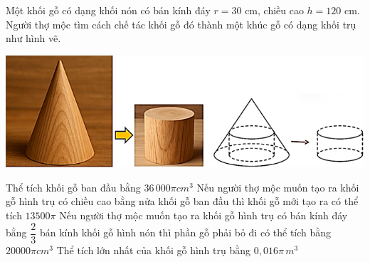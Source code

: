 \begin{ex}%
Một khối gỗ có dạng khối nón có bán kính đáy $r=30$ cm, chiều cao $h=120$ cm. Người thợ mộc tìm cách chế tác khối gỗ đó thành một khúc gỗ có dạng khối trụ như hình vẽ.\\
\centerline{
\includegraphics[width=.5\textwidth]{img/HXN-11-15}
}
 \choiceTF
 {\True Thể tích khối gỗ ban đầu bằng $36\,000\pi {cm^3}$}
 {\True Nếu người thợ mộc muốn tạo ra khối gỗ hình trụ có chiều cao bằng nửa khối gỗ ban đầu thì khối gỗ mới tạo ra có thể tích $ 13500\pi$}
 {\True Nếu người thợ mộc muốn tạo ra khối gỗ hình trụ có bán kính đáy bằng $\dfrac{2}{3}$ bán kính khối gỗ hình nón thì phần gỗ phải bỏ đi có thể tích bằng $ 20000\pi {cm^3}$}
 {\True Thể tích lớn nhất của khối gỗ hình trụ bằng $ 0,016\pi \,m^3$}
\end{ex}
